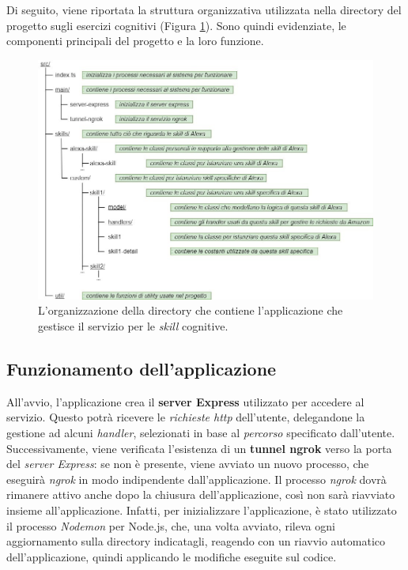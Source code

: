 Di seguito, viene riportata la struttura organizzativa utilizzata nella
directory del progetto sugli esercizi cognitivi (Figura \ref{fig:figure5.5}).
Sono quindi evidenziate, le componenti principali del progetto e la loro
funzione.

\begin{figure}[!ht]
  \centering
  \includegraphics[scale=0.58]{resources/images/implementation/alexa-project-organization.jpg}
  \caption{
    L'organizzazione della directory che contiene l'applicazione che gestisce
    il servizio per le \textit{skill} cognitive.
  }
  \label{fig:figure5.5}
\end{figure}

\subsection{Funzionamento dell'applicazione}
\label{subsec:Sezione5.2.2}

All’avvio, l’applicazione crea il \textbf{server Express} utilizzato per
accedere al servizio. Questo potrà ricevere le \textit{richieste http}
dell’utente, delegandone la gestione ad alcuni \textit{handler}, selezionati in
base al \textit{percorso} specificato dall’utente. Successivamente, viene
verificata l’esistenza di un \textbf{tunnel ngrok} verso la porta del
\textit{server Express}: se non è presente, viene avviato un nuovo processo,
che eseguirà \textit{ngrok} in modo indipendente dall’applicazione. Il processo
\textit{ngrok} dovrà rimanere attivo anche dopo la chiusura dell’applicazione,
così non sarà riavviato insieme all’applicazione. Infatti, per inizializzare
l’applicazione, è stato utilizzato il processo \textit{Nodemon} per Node.js,
che, una volta avviato, rileva ogni aggiornamento sulla directory indicatagli,
reagendo con un riavvio automatico dell’applicazione, quindi applicando le
modifiche eseguite sul codice.

